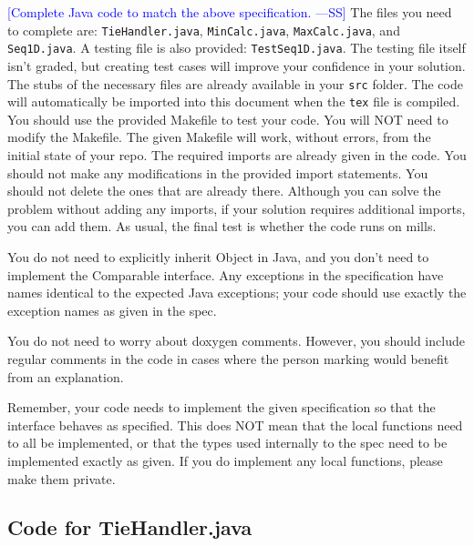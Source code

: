 \documentclass[12pt,fleqn]{examtst}
\newcommand{\authornote}[3]{\textcolor{#1}{[#3 ---#2]}}
\newcommand{\authornote}[3]{}
\newcommand{\wss}[1]{\authornote{blue}{SS}{#1}}
\begin{document}
\noindent
\begin{minipage}{\textwidth}
 \label{Q_JavaCode}

\wss{Complete Java code to match the above specification.}  The files you need
to complete are: \texttt{TieHandler.java}, \texttt{MinCalc.java},
\texttt{MaxCalc.java}, and \texttt{Seq1D.java}.  A testing file is also
provided: \texttt{TestSeq1D.java}.  The testing file itself isn't graded, but
creating test cases will improve your confidence in your solution.  The stubs of
the necessary files are already available in your \texttt{src} folder.  The code
will automatically be imported into this document when the \texttt{tex} file is
compiled.  You should use the provided Makefile to test your code.  You will NOT
need to modify the Makefile.
The given Makefile will work, without errors, from the initial state of your
repo.  The required imports are already given in the code.  You should not make
any modifications in the provided import statements.  You should not delete the
ones that are already there.  Although you can solve the problem without adding
any imports, if your solution requires additional imports, you can add them.  As
usual, the final test is whether the code runs on mills.

You do not need to explicitly inherit Object in Java, and you don't need to
implement the Comparable interface.  Any exceptions in the specification have
names identical to the expected Java exceptions; your code should use exactly the
exception names as given in the spec.

You do not need to worry about doxygen comments.  However, you should include
regular comments in the code in cases where the person marking would benefit
from an explanation.

Remember, your code needs to implement the given specification so that the
interface behaves as specified.  This does NOT mean that the local functions
need to all be implemented, or that the types used internally to the spec need
to be implemented exactly as given.  If you do implement any local functions,
please make them private.\\

\end{minipage}

\newpage

\subsection*{Code for TieHandler.java}
\end{document}
